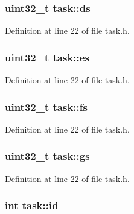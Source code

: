 \subsubsection[{\texorpdfstring{ds}{ds}}]{\setlength{\rightskip}{0pt plus 5cm}uint32\+\_\+t task\+::ds}\hypertarget{structtask_aa7479c4cde3fed5f6c19fbc857112310}{}\label{structtask_aa7479c4cde3fed5f6c19fbc857112310}


Definition at line 22 of file task.\+h.

\subsubsection[{\texorpdfstring{es}{es}}]{\setlength{\rightskip}{0pt plus 5cm}uint32\+\_\+t task\+::es}\hypertarget{structtask_a95a59f8605e8bda30d38f73b67af42cc}{}\label{structtask_a95a59f8605e8bda30d38f73b67af42cc}


Definition at line 22 of file task.\+h.

\subsubsection[{\texorpdfstring{fs}{fs}}]{\setlength{\rightskip}{0pt plus 5cm}uint32\+\_\+t task\+::fs}\hypertarget{structtask_a2cb171a9e5b5d739cad8b83dffd05be3}{}\label{structtask_a2cb171a9e5b5d739cad8b83dffd05be3}


Definition at line 22 of file task.\+h.

\subsubsection[{\texorpdfstring{gs}{gs}}]{\setlength{\rightskip}{0pt plus 5cm}uint32\+\_\+t task\+::gs}\hypertarget{structtask_a711674cead4b90d23503f3dfba0a489e}{}\label{structtask_a711674cead4b90d23503f3dfba0a489e}


Definition at line 22 of file task.\+h.

\subsubsection[{\texorpdfstring{id}{id}}]{\setlength{\rightskip}{0pt plus 5cm}int task\+::id}\hypertarget{structtask_a22d3a20ff225043177b269ec1a0a5f1a}{}\label{structtask_a22d3a20ff225043177b269ec1a0a5f1a}


